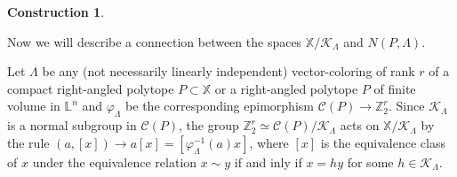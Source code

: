 \documentclass[12pt]{amsart}
\theoremstyle{definition}
\newtheorem{construction}[formula]{Construction}
\theoremstyle{remark}
\newtheorem{remark}[formula]{Remark}
\begin{document}
\begin{construction}
\end{construction}
Now we will describe a connection between the spaces $\mathbb X/\mathcal{K}_{\Lambda}$ and $N(P,\Lambda)$.

Let $\Lambda$ be any (not necessarily linearly independent) 
vector-coloring of rank $r$ of a compact right-angled polytope $P\subset\mathbb X$ or a right-angled polytope $P$ of finite volume
in $\mathbb L^n$ and $\varphi_\Lambda$ be the corresponding epimorphism $\mathcal{C}(P)\to\mathbb Z_2^r$. 
Since $\mathcal{K}_{\Lambda}$ is a normal subgroup in $\mathcal{C}(P)$, the group 
$\mathbb Z_2^r\simeq \mathcal{C}(P)/\mathcal{K}_{\Lambda}$ acts on $\mathbb X/\mathcal{K}_{\Lambda}$
by the rule $(a,[x])\to a[x]=[\varphi_\Lambda^{-1}(a)x]$, where $[x]$ is the equivalence class of $x$ under the equivalence
relation $x\sim y$
if and inly if $x=hy$ for some $h\in \mathcal{K}_{\Lambda}$. 
\end{document}
